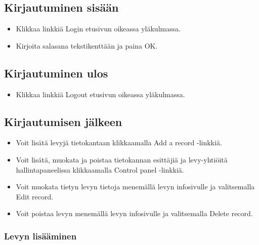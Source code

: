 \documentclass[a4paper,12pt]{report}
\begin{document}
\subsection{Kirjautuminen sisään}

\begin{itemize}
  \item Klikkaa linkkiä Login etusivun oikeassa yläkulmassa.
  \item Kirjoita salasana tekstikenttään ja paina OK.
\end{itemize}
	
\subsection{Kirjautuminen ulos}

\begin{itemize}
  \item Klikkaa linkkiä Logout etusivun oikeassa yläkulmassa.
\end{itemize}
	
\subsection{Kirjautumisen jälkeen}

\begin{itemize}
  \item Voit lisätä levyjä tietokantaan klikkaamalla Add a record -linkkiä.
  \item Voit lisätä, muokata ja poistaa tietokannan esittäjiä ja levy-yhtiöitä
    hallintapaneelissa klikkaamalla Control panel -linkkiä.
  \item Voit muokata tietyn levyn tietoja menemällä levyn infosivulle ja
    valitsemalla Edit record.
  \item Voit poistaa levyn menemällä levyn infosivulle ja valitsemalla Delete
    record.
\end{itemize}
	
\subsubsection{Levyn lisääminen}
\end{document}
